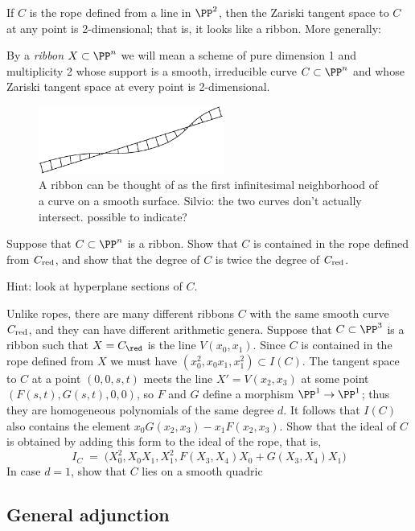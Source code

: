 If $C$ is the rope defined from a line in $\PP^2$, then the Zariski tangent space to $C$ at
any point is 2-dimensional; that is, it looks like a ribbon. More generally:

\begin{definition}
By a \emph{ribbon} $X \subset \PP^n$ we will mean a scheme of pure dimension 1 and multiplicity 2 whose support is a smooth, irreducible curve $C \subset \PP^n$ and whose Zariski tangent space at every point is 2-dimensional.
\end{definition}


\begin{figure}
\centerline {\includegraphics[width=2.4in]{"main/Fig15-3"}}
\caption{A ribbon can be thought of as the first infinitesimal neighborhood
of a curve on a smooth surface. {Silvio: the two curves don't actually intersect. possible to indicate?}}
\label{Fig15.3}
\end{figure}

\begin{exercise}
Suppose that $C\subset \PP^n$ is a ribbon. Show that $C$ is contained in the rope defined
from $C_{\rm red}$, and show that the degree of $C$ is twice the degree of $C_{\rm red}$.

Hint: look at hyperplane sections of $C$.
\end{exercise}

Unlike ropes, there are many different ribbons $C$ with the same smooth curve $C_{\rm red}$,
and they can have different arithmetic genera. 
Suppose that $C\subset \PP^3$ is a ribbon such that $X = C_{\red}$ is the line $V(x_0,x_1)$.
Since $C$ is contained in the rope defined from $X$ we must have $(x_0^2, x_0x_1,x_1^2) \subset I(C)$. The tangent space to $C$ at a point $(0,0,s,t)$ meets the line  $X' = V(x_2, x_3)$
at some point $(F(s,t),G(s,t),0,0)$, so $F$ and $G$ define a morphism $\PP^1 \to \PP^1$;
thus they are homogeneous polynomials of the same degree $d$.  It follows that $I(C)$ also contains the element
$x_0 G(x_2, x_3) - x_1F(x_2,x_3)$. Show that the ideal of $C$ is obtained by adding this form to the ideal of the rope, that is,
$$
I_C \; = \; \big(X_0^2, X_0X_1, X_1^2, F(X_3,X_4)X_0 + G(X_3,X_4)X_1\big)
$$
In case $d=1$, show that $C$ lies on a smooth quadric 
\subsection{General adjunction}


